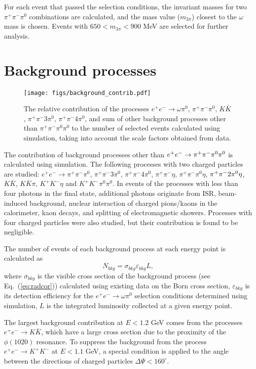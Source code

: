 \documentclass[twocolumn,aps,prd,floatfix,nofootinbib,superscriptaddress]{revtex4-2}
\def\mbb{\linebreak[0]}
\begin{document}
For each event that passed the selection conditions, the invariant masses for two $\pi^+\pi^-\pi^0$ combinations are calculated, and the mass value ($m_{3\pi}$) closest to the $\omega$ mass is chosen.
Events with \( 650 < m_{3\pi} < 900 \) MeV are selected for further analysis.

\section{Background processes}
\label{sec:background}

\begin{figure*}
\centering
\texttt{[image: figs/background\_contrib.pdf]}
\caption{
	The relative contribution of the processes \( e^+e^- \to \omega\pi^0 \), $\pi^+\pi^-\pi^0$, $K \bar{K}$, $\pi^+\pi^- 3\pi^0$, $\pi^+\pi^- 4\pi^0$, and sum of other background processes other than $\pi^+\pi^-\pi^0\pi^0$ to the number of selected events calculated using simulation, taking into account the scale factors obtained from data.
}
\label{fig:cross_mix}
\end{figure*}

The contribution of background processes other than \( e^+e^- \to \pi^+\pi^-\mbb\pi^0\pi^0 \) is calculated using simulation.
The following processes with two charged particles are studied:
\( e^+e^- \to \pi^+\pi^-\pi^0 \), $\pi^+\pi^- 3\pi^0$, $\pi^+\pi^- 4\pi^0$,
$\pi^+\pi^-\eta$, $\pi^+\pi^-\pi^0\eta$, $\pi^+\pi^-\mbb2\pi^0\eta$,
$K \bar{K}$, $K \bar{K} \pi$, $K^+K^-\eta$ and $K^+K^-\pi^0\pi^0$.
In events of the processes with less than four photons in the final state, additional photons originate from ISR, beam-induced background, nuclear interaction of charged pions/kaons in the calorimeter, kaon decays, and splitting of electromagnetic showers.
Processes with four charged particles were also studied, but their contribution is found to be negligible.

The number of events of each background process at each energy point is calculated as
\[ N_{bkg} = \sigma_{bkg} \varepsilon_{bkg} L, \]
where $\sigma_{bkg}$ is the visible cross section of the background process (see Eq.~(\ref{eq:radcor})) calculated using existing data on the Born cross section,
$\varepsilon_{bkg}$ is its detection efficiency for the \( e^+e^- \to \omega\pi^0 \) selection conditions determined using simulation,
$L$ is the integrated luminosity collected at a given energy point.

The largest background contribution at \( E < 1.2 \) GeV comes from the processes \( e^+e^- \to K\bar{K} \), which have a large cross section due to the proximity of the $\phi(1020)$ resonance.
To suppress the background from the process \( e^+e^- \to K^+K^- \) at \( E < 1.1 \) GeV, a special condition is applied to the angle between the directions of charged particles \( \Delta\Psi < 160^\circ\).
\end{document}
